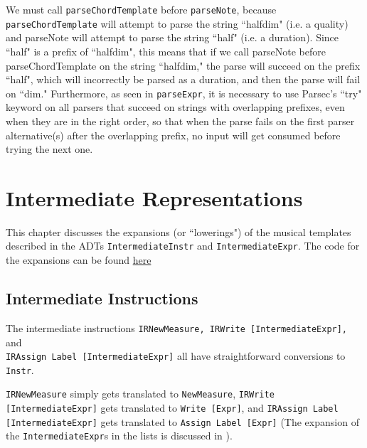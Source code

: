 \documentclass{report}
\begin{document}
We must call \verb.parseChordTemplate. before \verb.parseNote., because \verb.parseChordTemplate. will attempt to parse the string ``halfdim" (i.e. a quality) and parseNote will attempt to parse the string ``half" (i.e. a duration). Since ``half" is a prefix of ``halfdim", this means that if we call parseNote before parseChordTemplate on the string ``halfdim," the parse will succeed on the prefix ``half", which will incorrectly be parsed as a duration, and then the parse will fail on ``dim." Furthermore, as seen in \verb.parseExpr., it is necessary to use Parsec's ``try" keyword on all parsers that succeed on strings with overlapping prefixes, even when they are in the right order, so that when the parse fails on the first parser alternative(s) after the overlapping prefix, no input will get consumed before trying the next one.

\chapter{Intermediate Representations}
\label{chap:ir}
This chapter discusses the expansions (or ``lowerings") of the musical templates described in the ADTs \verb.IntermediateInstr. and \verb.IntermediateExpr.. The code for the expansions can be found \href{https://github.com/ilanashapiro/MusAssist/blob/main/app/IRConversion.hs}{here}

\section{Intermediate Instructions}
The intermediate instructions \verb.IRNewMeasure, IRWrite [IntermediateExpr],. and \\\verb.IRAssign Label [IntermediateExpr]. all have straightforward conversions to \verb.Instr.. 

\verb.IRNewMeasure. simply gets translated to \verb.NewMeasure., \verb.IRWrite [IntermediateExpr]. gets translated to \verb.Write [Expr]., and \verb.IRAssign Label [IntermediateExpr]. gets translated to \verb.Assign Label [Expr]. (The expansion of the \verb.IntermediateExpr.s in the lists is discussed in ). 
\end{document}
